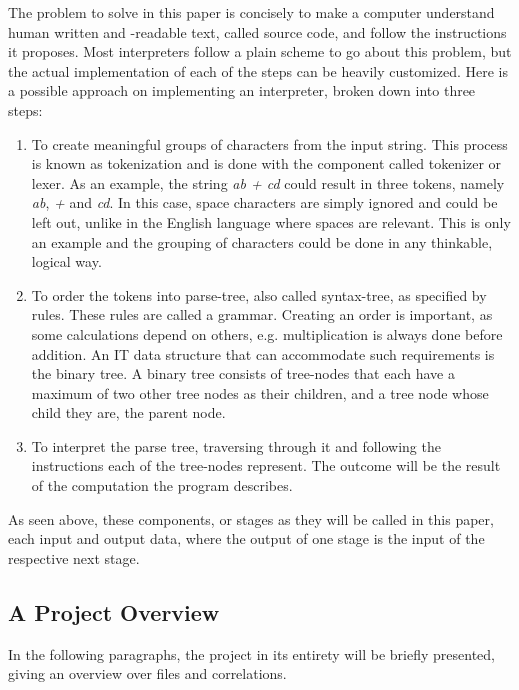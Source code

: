 \documentclass[12pt,a4paper]{article}
\newcommand{\pagelabel}[1]{\phantomsection\label{#1}}
\begin{document}
The problem to solve in this paper is concisely to make a computer understand
human written and -readable text, called source code, and follow the instructions
it proposes.
Most interpreters follow a plain scheme to go about this problem, but the
actual implementation of each of the steps can be heavily customized.
Here is a possible approach on implementing an interpreter, broken
down into three steps:
\begin{enumerate}\pagelabel{simple_interpreter}
    \item To create meaningful groups of characters from the input string. This
        process is known as tokenization and is done with the component called
        tokenizer or lexer. As an example, the string \emph{ab + cd} could result
        in three tokens, namely \emph{ab}, \emph{+} and \emph{cd}. In this case, space characters
        are simply ignored and could be left out, unlike in the English language where spaces are relevant. 
        This is only an example and the grouping of characters could be done 
        in any thinkable, logical way.
    \item To order the tokens into parse-tree, also called syntax-tree, as
        specified by rules. These rules are called a grammar.
        Creating an order is important, as some calculations depend on others, e.g. multiplication
        is always done before addition. An IT data structure that can accommodate
        such requirements is the binary tree. A binary tree consists of tree-nodes
        that each have a maximum of two other tree nodes as their children, and
        a tree node whose child they are, the parent node.
    \item To interpret the parse tree, traversing through it and following the
        instructions each of the tree-nodes represent. The outcome
        will be the result of the computation the program describes.
\end{enumerate}

As seen above, these components, or stages as they will be called in this paper,
each input and output data, where the output of one stage is the input of the
respective next stage.

\subsection{A Project Overview}
In the following paragraphs, the project in its entirety will be briefly
presented, giving an overview over files and correlations.
\end{document}
